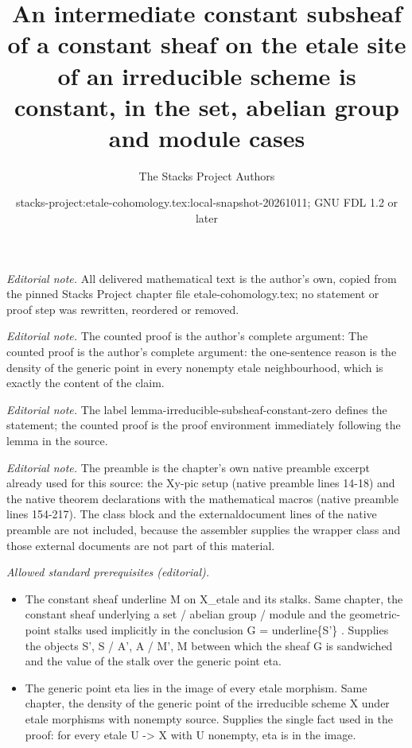 \documentclass[10pt,a4paper]{amsart}
\title{An intermediate constant subsheaf of a constant sheaf on the etale site of an irreducible scheme is constant, in the set, abelian group and module cases}
\author{The Stacks Project Authors}
\date{stacks-project:etale-cohomology.tex:local-snapshot-20261011; GNU FDL 1.2 or later}
\theoremstyle{plain}
\theoremstyle{definition}
\theoremstyle{remark}
\numberwithin{equation}{subsection}
\begin{document}
\maketitle
\noindent\textit{Editorial note.} All delivered mathematical text is the author's own, copied from the pinned Stacks Project chapter file etale-cohomology.tex; no statement or proof step was rewritten, reordered or removed.\par\medskip
\noindent\textit{Editorial note.} The counted proof is the author's complete argument: The counted proof is the author's complete argument: the one-sentence reason is the density of the generic point in every nonempty etale neighbourhood, which is exactly the content of the claim.\par\medskip
\noindent\textit{Editorial note.} The label lemma-irreducible-subsheaf-constant-zero defines the statement; the counted proof is the proof environment immediately following the lemma in the source.\par\medskip
\noindent\textit{Editorial note.} The preamble is the chapter's own native preamble excerpt already used for this source: the Xy-pic setup (native preamble lines 14-18) and the native theorem declarations with the mathematical macros (native preamble lines 154-217). The class block and the externaldocument lines of the native preamble are not included, because the assembler supplies the wrapper class and those external documents are not part of this material.\par\medskip
\noindent\textit{Allowed standard prerequisites (editorial).}\begin{itemize}
\item The constant sheaf underline M on X\_etale and its stalks. Same chapter, the constant sheaf underlying a set / abelian group / module and the geometric-point stalks used implicitly in the conclusion G = underline\{S'\} . Supplies the objects S', S / A', A / M', M between which the sheaf G is sandwiched and the value of the stalk over the generic point eta.
\item The generic point eta lies in the image of every etale morphism. Same chapter, the density of the generic point of the irreducible scheme X under etale morphisms with nonempty source. Supplies the single fact used in the proof: for every etale U -> X with U nonempty, eta is in the image.
\end{itemize}\medskip
\end{document}
